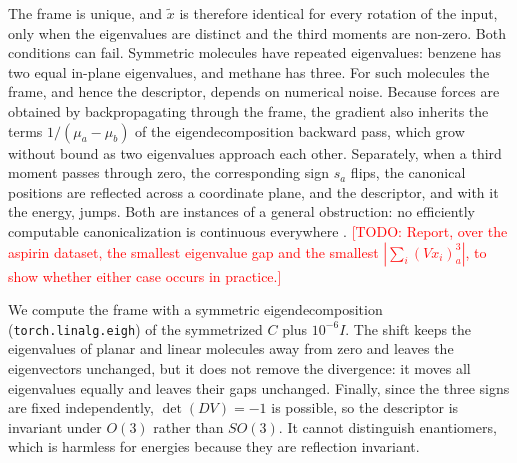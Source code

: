 \documentclass{article}
\newcommand{\todo}[1]{\textcolor{red}{[TODO: #1]}}
\begin{document}
The frame is unique, and $\tilde x$ is therefore identical for every rotation of the input, only when the eigenvalues are distinct and the third moments are non-zero. Both conditions can fail. Symmetric molecules have repeated eigenvalues: benzene has two equal in-plane eigenvalues, and methane has three. For such molecules the frame, and hence the descriptor, depends on numerical noise. Because forces are obtained by backpropagating through the frame, the gradient also inherits the terms $1/(\mu_a-\mu_b)$ of the eigendecomposition backward pass, which grow without bound as two eigenvalues approach each other. Separately, when a third moment passes through zero, the corresponding sign $s_a$ flips, the canonical positions are reflected across a coordinate plane, and the descriptor, and with it the energy, jumps. Both are instances of a general obstruction: no efficiently computable canonicalization is continuous everywhere \citep{dym2024frames}. \todo{Report, over the aspirin dataset, the smallest eigenvalue gap and the smallest $|\sum_i (Vx_i)_a^3|$, to show whether either case occurs in practice.}

We compute the frame with a symmetric eigendecomposition (\texttt{torch.linalg.eigh}) of the symmetrized $C$ plus $10^{-6} I$. The shift keeps the eigenvalues of planar and linear molecules away from zero and leaves the eigenvectors unchanged, but it does not remove the divergence: it moves all eigenvalues equally and leaves their gaps unchanged. Finally, since the three signs are fixed independently, $\det(DV) = -1$ is possible, so the descriptor is invariant under $O(3)$ rather than $SO(3)$. It cannot distinguish enantiomers, which is harmless for energies because they are reflection invariant.
\end{document}
